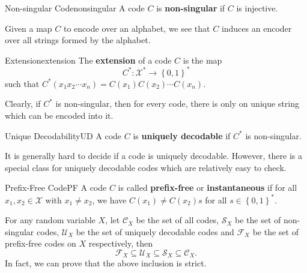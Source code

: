 \documentclass[math]{amznotes}
\theoremstyle{remark}
\begin{document}
\begin{dfnbox}{Non-singular Code}{nonsingular}
    A code $C$ is {\color{red} \textbf{non-singular}} if $C$ is injective.
\end{dfnbox}
Given a map $C$ to encode over an alphabet, we see that $C$ induces an encoder over all strings formed by the alphabet.
\begin{dfnbox}{Extension}{extension}
    The {\color{red} \textbf{extension}} of a code $C$ is the map 
    \begin{equation*}
        C^* \colon \mathcal{X}^* \to \left\{0, 1\right\}^*
    \end{equation*}
    such that $C^*\left(x_1x_2\cdots x_n\right) = C\left(x_1\right)C\left(x_2\right)\cdots C\left(x_n\right)$.
\end{dfnbox}
Clearly, if $C^*$ is non-singular, then for every code, there is only on unique string which can be encoded into it.
\begin{dfnbox}{Unique Decodability}{UD}
    A code $C$ is {\color{red} \textbf{uniquely decodable}} if $C^*$ is non-singular.
\end{dfnbox}
It is generally hard to decide if a code is uniquely decodable. However, there is a special class for uniquely decodable codes which are relatively easy to check.
\begin{dfnbox}{Prefix-Free Code}{PF}
    A code $C$ is called {\color{red} \textbf{prefix-free}} or {\color{red} \textbf{instantaneous}} if for all $x_1, x_2 \in \mathcal{X}$ with $x_1 \neq x_2$, we have $C\left(x_1\right) \neq C\left(x_2\right)s$ for all $s \in \left\{0, 1\right\}^*$.
\end{dfnbox}
For any random variable $X$, let $\mathcal{C}_X$ be the set of all codes, $\mathcal{S}_X$ be the set of non-singular codes, $\mathcal{U}_X$ be the set of uniquely decodable codes and $\mathcal{F}_X$ be the set of prefix-free codes on $X$ respectively, then 
\begin{equation*}
    \mathcal{F}_X \subseteq \mathcal{U}_X \subseteq \mathcal{S}_X \subseteq \mathcal{C}_X.
\end{equation*}
In fact, we can prove that the above inclusion is strict.
\end{document}
